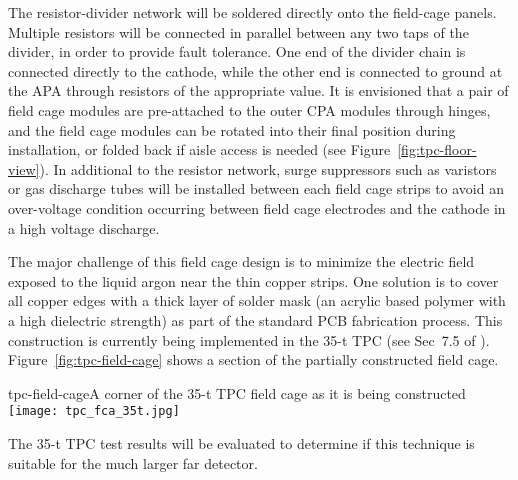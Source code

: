 The resistor-divider network will be soldered directly onto the
field-cage panels. Multiple resistors will be connected in parallel
between any two taps of the divider, in order to provide fault
tolerance. One end of the divider chain is connected directly to the
cathode, while the other end is connected to ground at the APA through
resistors of the appropriate value.  It is envisioned that a pair of
field cage modules are pre-attached to the outer CPA modules through
hinges, and the field cage modules can be rotated into their final
position during installation, or folded back if aisle access is needed
(see Figure~\ref{fig:tpc-floor-view}).  In additional to the resistor
network, surge suppressors such as varistors or gas discharge tubes
will be installed between each field cage strips to avoid an
over-voltage condition occurring between field cage electrodes and the
cathode in a high voltage discharge.

The major challenge of this field cage design is to minimize the
electric field exposed to the liquid argon near the thin copper
strips.  One solution is to cover all copper edges with a thick layer
of solder mask (an acrylic based polymer with a high dielectric
strength) as part of the standard PCB fabrication process.  This
construction is currently being implemented in the 35-t TPC (see
Sec~7.5 of \anxlbnefd).  Figure~\ref{fig:tpc-field-cage} shows a
section of the partially constructed field cage.  
\begin{cdrfigure}{tpc-field-cage}{A corner of the 35-t TPC 
field cage as it is being constructed}
\texttt{[image: tpc\_fca\_35t.jpg]}
\end{cdrfigure}
The 35-t TPC test results will be evaluated to determine if this
technique is suitable for the much larger far detector.
 
